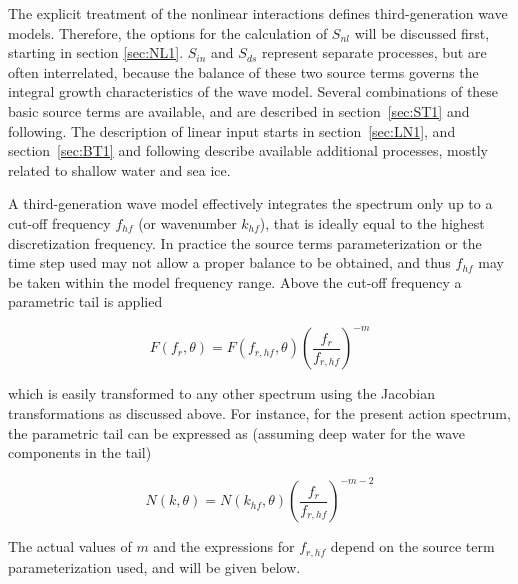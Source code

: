 The explicit treatment of the nonlinear interactions defines third-generation wave
models. Therefore, the options for the calculation of $S_{nl}$ will be
discussed first, starting in section \ref{sec:NL1}. $S_{in}$ and $S_{ds}$
represent separate processes, but are often interrelated,
because the balance of these two source terms governs the integral growth
characteristics of the wave model. Several combinations of these basic source
terms are available, and are described in section~\ref{sec:ST1} and following.
The description of linear input starts in section~\ref{sec:LN1}, and
section~\ref{sec:BT1} and following describe available additional processes, mostly
related to shallow water and sea ice. 

\vspace{\baselineskip} \noindent
A third-generation wave model effectively integrates the spectrum only up to a
cut-off frequency $f_{hf}$ (or wavenumber $k_{hf}$), that is ideally equal to the 
highest discretization frequency. In practice the source terms parameterization or the time step used may not allow a proper 
balance to be obtained, and thus $f_{hf}$  may be taken within the model frequency range. Above the cut-off frequency a
parametric tail is applied \citep[e.g.,][]{art:WAM88}


\begin{equation}
F(f_r,\theta) = F(f_{r,hf},\theta) \left ( \frac{f_r}{f_{r,hf}}
\right ) ^{-m} \label{eq:tail_E_f}
\end{equation}

\noindent
which is easily transformed to any other spectrum using the Jacobian
transformations as discussed above. For instance, for the present action
spectrum, the parametric tail can be expressed as (assuming deep water for the
wave components in the tail)


\begin{equation}
N(k,\theta) = N(k_{hf},\theta) \left ( \frac{f_r}{f_{r,hf}}
\right ) ^{-m-2} \label{eq:tail_N_k}
\end{equation}

\noindent
The actual values of $m$ and the expressions for $f_{r,hf}$ depend on the
source term parameterization used, and will be given below.

